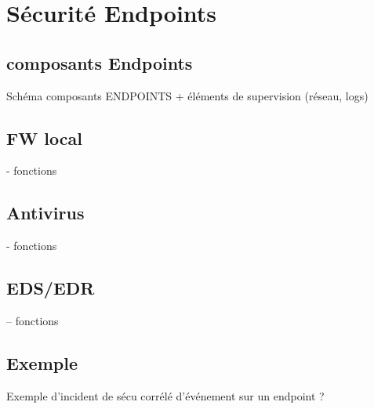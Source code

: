 

\section{Sécurité Endpoints}
\subsection{composants Endpoints}
Schéma composants ENDPOINTS + éléments de supervision (réseau, logs)
\subsection{FW local}
- fonctions
\subsection{Antivirus}
- fonctions
\subsection{EDS/EDR}
– fonctions
\subsection{Exemple}
Exemple d’incident de sécu corrélé d’événement sur un endpoint ?







